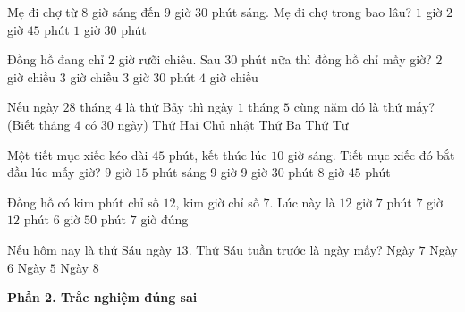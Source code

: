 \begin{ex} %
Mẹ đi chợ từ $8$ giờ sáng đến $9$ giờ $30$ phút sáng. Mẹ đi chợ trong bao lâu?
\choice
{$1$ giờ}
{$2$ giờ}
{$45$ phút}
{\True $1$ giờ $30$ phút}
\end{ex}

\begin{ex} %
Đồng hồ đang chỉ $2$ giờ rưỡi chiều. Sau $30$ phút nữa thì đồng hồ chỉ mấy giờ?
\choice
{$2$ giờ chiều}
{\True $3$ giờ chiều}
{$3$ giờ $30$ phút}
{$4$ giờ chiều}
\end{ex}

\begin{ex} %
Nếu ngày $28$ tháng $4$ là thứ Bảy thì ngày $1$ tháng $5$ cùng năm đó là thứ mấy? (Biết tháng $4$ có $30$ ngày)
\choice
{Thứ Hai}
{Chủ nhật}
{\True Thứ Ba}
{Thứ Tư}
\end{ex}

\begin{ex} %
Một tiết mục xiếc kéo dài $45$ phút, kết thúc lúc $10$ giờ sáng. Tiết mục xiếc đó bắt đầu lúc mấy giờ?
\choice
{\True $9$ giờ $15$ phút sáng}
{$9$ giờ}
{$9$ giờ $30$ phút}
{$8$ giờ $45$ phút}
\end{ex}

\begin{ex} %
Đồng hồ có kim phút chỉ số $12$, kim giờ chỉ số $7$. Lúc này là
\choice
{$12$ giờ $7$ phút}
{$7$ giờ $12$ phút}
{$6$ giờ $50$ phút}
{\True $7$ giờ đúng}
\end{ex}

\begin{ex} %
Nếu hôm nay là thứ Sáu ngày $13$. Thứ Sáu tuần trước là ngày mấy?
\choice
{Ngày $7$}
{\True Ngày $6$}
{Ngày $5$}
{Ngày $8$}
\end{ex}

\textbf{Phần 2. Trắc nghiệm đúng sai}

